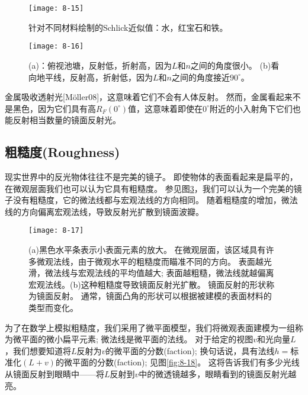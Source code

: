 \begin{figure}[h]
    \texttt{[image: 8-15]}
    \centering
    \caption{针对不同材料绘制的Schlick近似值：水，红宝石和铁。}
    \label{fig:8-15}
\end{figure}

\begin{figure}[h]
    \texttt{[image: 8-16]}
    \centering
    \caption{(a)：俯视池塘，反射低，折射高，因为$L$和$n$之间的角度很小。 (b)看向地平线，反射高，折射低，因为$L$和$n$之间的角度接近$90^{\circ}$。}
    \label{fig:8-16}
\end{figure}

\begin{flushleft}
金属吸收透射光[Möller08]，这意味着它们不会有人体反射。 然而，金属看起来不是黑色，因为它们具有高$R_{F}(0^{\circ})$值，这意味着即使在$0^{\circ}$附近的小入射角下它们也能反射相当数量的镜面反射光。\\
\end{flushleft}
\clearpage

\subsection{粗糙度(Roughness)}
\begin{flushleft}
现实世界中的反光物体往往不是完美的镜子。 即使物体的表面看起来是扁平的，在微观层面我们也可以认为它具有粗糙度。 参见图\ref{fig:8-17}，我们可以认为一个完美的镜子没有粗糙度，它的微法线都与宏观法线的方向相同。 随着粗糙度的增加，微法线的方向偏离宏观法线，导致反射光扩散到镜面波瓣。
\end{flushleft}

\begin{figure}[h]
    \texttt{[image: 8-17]}
    \centering
    \caption{(a)黑色水平条表示小表面元素的放大。 在微观层面，该区域具有许多微观法线，由于微观水平的粗糙度而瞄准不同的方向。 表面越光滑，微法线与宏观法线的平均值越大; 表面越粗糙，微法线就越偏离宏观法线。(b)这种粗糙度导致镜面反射光扩散。 镜面反射的形状称为镜面反射。 通常，镜面凸角的形状可以根据被建模的表面材料的类型而变化。}
    \label{fig:8-17}
\end{figure}

\begin{flushleft}
为了在数学上模拟粗糙度，我们采用了微平面模型，我们将微观表面建模为一组称为微平面的微小扁平元素; 微法线是微平面的法线。 对于给定的视图$v$和光向量$L$，我们想要知道将$L$反射为$v$的微平面的分数(faction); 换句话说，具有法线$h=$标准化$(L + v)$的微平面的分数(faction); 见图\ref{fig:8-18}。 这将告诉我们有多少光线从镜面反射到眼睛中——将$L$反射到$v$中的微透镜越多，眼睛看到的镜面反射光越亮。
\end{flushleft}

